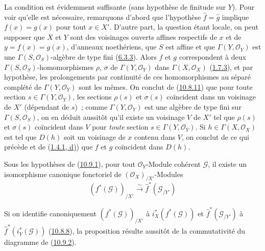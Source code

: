 La condition est évidemment suffisante (sans hypothèse de finitude sur
$Y$). Pour voir qu'elle est nécessaire, remarquons d'abord que l'hypothèse
$\widehat f=\widehat g$ implique $f(x)=g(x)$ pour tout $x\in X'$. D'autre
part, la question étant locale, on peut supposer que $X$ et $Y$ sont des
voisinages ouverts affines respectifs de $x$ et de $y=f(x)=g(x)$,
d'anneaux noethériens, que $S$ est affine et que
$\Gamma(Y,\mathscr{O}_Y)$ est une $\Gamma(S,\mathscr{O}_S)$-algèbre de
type fini (\hyperref[I.6.3.3-fr]{6.3.3}). Alors $f$ et $g$ correspondent à
deux $\Gamma(S,\mathscr{O}_S)$-homomorphismes $\rho$, $\sigma$ de
$\Gamma(Y,\mathscr{O}_Y)$ dans $\Gamma(X,\mathscr{O}_X)$
(\hyperref[I.1.7.3-fr]{1.7.3}), et par hypothèse, les prolongements par
continuité de ces homomorphismes au séparé complété de
$\Gamma(Y,\mathscr{O}_Y)$ sont les mêmes. On conclut de
(\hyperref[I.10.8.11-fr]{10.8.11}) que pour toute section
$s\in\Gamma(Y,\mathscr{O}_Y)$, les sections $\rho(s)$ et $\sigma(s)$
coïncident dans un voisinage de $X'$ (dépendant de $s$)~; comme
$\Gamma(Y,\mathscr{O}_Y)$ est une algèbre de type fini sur
$\Gamma(S,\mathscr{O}_S)$, on en déduit aussitôt qu'il existe un
voisinage $V$ de $X'$ tel que $\rho(s)$ et $\sigma(s)$ coïncident dans
$V$ pour \emph{toute} section $s\in\Gamma(Y,\mathscr{O}_Y)$. Si
$h\in\Gamma(X,\mathscr{O}_X)$ est tel que $D(h)$ soit un voisinage de $x$
contenu dans $V$, on conclut de ce qui précède et de
(\hyperref[I.1.4.1-fr]{1.4.1, d)}) que $f$ et $g$ coïncident dans $D(h)$.

\begin{proposition}[10.9.5]
\label{I.10.9.5-fr}
Sous les hypothèses de (\hyperref[I.10.9.1-fr]{10.9.1}), pour tout
$\mathscr{O}_Y$-Module cohérent $\mathscr{G}$, il existe un isomorphisme
canonique fonctoriel de $(\mathscr{O}_X)_{/X'}$-Modules
\[
  (f^*(\mathscr{G}))_{/X'}\xrightarrow{\sim}
  \widehat f^*(\mathscr{G}_{/Y'})
\]
\end{proposition}

Si on identifie canoniquement $(f^*(\mathscr{G}))_{/X'}$ à
$i_X^*(f^*(\mathscr{G}))$ et $\widehat f^*(\mathscr{G}_{/Y'})$ à
$\widehat f^*(i_Y^*(\mathscr{G}))$
(\hyperref[I.10.8.8-fr]{10.8.8}), la proposition résulte aussitôt de la
commutativité du diagramme de
(\hyperref[I.10.9.2-fr]{10.9.2}).

